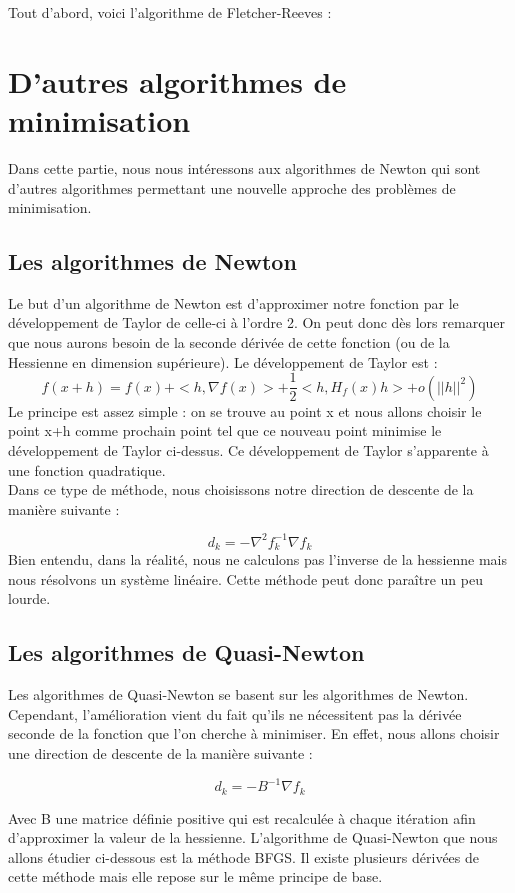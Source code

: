Tout d'abord, voici l'algorithme de Fletcher-Reeves : 




\section{D'autres algorithmes de minimisation}
Dans cette partie, nous nous intéressons aux algorithmes de Newton qui sont d'autres algorithmes permettant une nouvelle approche des problèmes de minimisation.
\subsection{Les algorithmes de Newton}
Le but d'un algorithme de Newton est d'approximer notre fonction par le développement de Taylor de celle-ci à l'ordre 2. On peut donc dès lors remarquer que nous aurons besoin de la seconde dérivée de cette fonction (ou de la Hessienne en dimension supérieure). Le développement de Taylor est  : 
\begin{equation}
f(x+h) = f(x) + <h, \nabla f(x)> + \frac{1}{2} <h, H_f(x)h> + o(||h||^2)
\end{equation}
Le principe est assez simple : on se trouve au point x et nous allons choisir le point x+h comme prochain point tel que ce nouveau point minimise le développement de Taylor ci-dessus. Ce développement de Taylor s'apparente à une fonction quadratique.\\

Dans ce type de méthode, nous choisissons notre direction de descente de la manière suivante : 

\begin{equation}
d_k = -\nabla^2f_k^{-1}\nabla f_k
\end{equation}
Bien entendu, dans la réalité, nous ne calculons pas l'inverse de la hessienne mais nous résolvons un système linéaire. Cette méthode peut donc paraître un peu lourde.
\subsection{Les algorithmes de Quasi-Newton}
Les algorithmes de Quasi-Newton se basent sur les algorithmes de Newton. Cependant, l'amélioration vient du fait qu'ils ne nécessitent pas la dérivée seconde de la fonction que l'on cherche à minimiser. En effet, nous allons choisir une direction de descente de la manière suivante : 

\begin{equation}
d_k = -B^{-1}\nabla f_k
\end{equation}

Avec B une matrice définie positive qui est recalculée à chaque itération afin d'approximer la valeur de la hessienne. L'algorithme de Quasi-Newton que nous allons étudier ci-dessous est  la méthode BFGS. Il existe plusieurs dérivées de cette méthode mais elle repose sur le même principe de base.